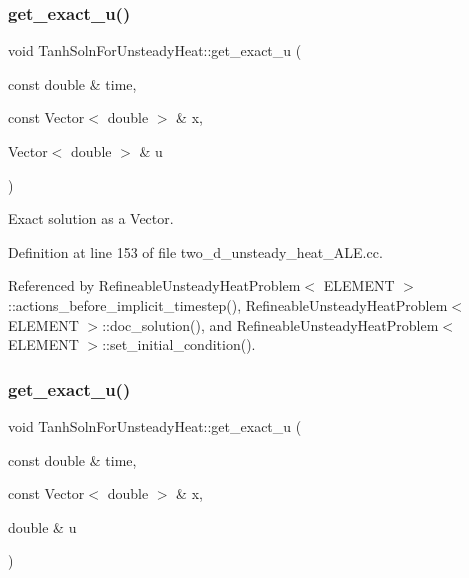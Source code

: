 \subsubsection{\texorpdfstring{get\+\_\+exact\+\_\+u()}{get\_exact\_u()}\hspace{0.1cm}{\footnotesize\ttfamily [1/2]}}
{\footnotesize\ttfamily void Tanh\+Soln\+For\+Unsteady\+Heat\+::get\+\_\+exact\+\_\+u (\begin{DoxyParamCaption}\item[{const double \&}]{time,  }\item[{const Vector$<$ double $>$ \&}]{x,  }\item[{Vector$<$ double $>$ \&}]{u }\end{DoxyParamCaption})}



Exact solution as a Vector. 



Definition at line 153 of file two\+\_\+d\+\_\+unsteady\+\_\+heat\+\_\+\+A\+L\+E.\+cc.



Referenced by Refineable\+Unsteady\+Heat\+Problem$<$ E\+L\+E\+M\+E\+N\+T $>$\+::actions\+\_\+before\+\_\+implicit\+\_\+timestep(), Refineable\+Unsteady\+Heat\+Problem$<$ E\+L\+E\+M\+E\+N\+T $>$\+::doc\+\_\+solution(), and Refineable\+Unsteady\+Heat\+Problem$<$ E\+L\+E\+M\+E\+N\+T $>$\+::set\+\_\+initial\+\_\+condition().

\mbox{\label{namespaceTanhSolnForUnsteadyHeat_a62871b93b792298dcdade93bde0085ff}} 
\subsubsection{\texorpdfstring{get\+\_\+exact\+\_\+u()}{get\_exact\_u()}\hspace{0.1cm}{\footnotesize\ttfamily [2/2]}}
{\footnotesize\ttfamily void Tanh\+Soln\+For\+Unsteady\+Heat\+::get\+\_\+exact\+\_\+u (\begin{DoxyParamCaption}\item[{const double \&}]{time,  }\item[{const Vector$<$ double $>$ \&}]{x,  }\item[{double \&}]{u }\end{DoxyParamCaption})}



